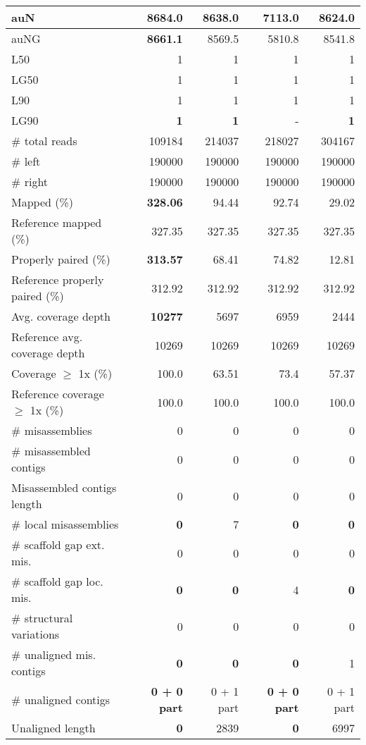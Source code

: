\documentclass[12pt,a4paper]{article}
\begin{document}
\begin{table}[ht]
\begin{center}
\begin{tabular}{|l*{4}{|r}|}
auN & {\bf 8684.0} & 8638.0 & 7113.0 & 8624.0 \\ \hline
auNG & {\bf 8661.1} & 8569.5 & 5810.8 & 8541.8 \\ \hline
L50 & 1 & 1 & 1 & 1 \\ \hline
LG50 & 1 & 1 & 1 & 1 \\ \hline
L90 & 1 & 1 & 1 & 1 \\ \hline
LG90 & {\bf 1} & {\bf 1} & - & {\bf 1} \\ \hline
\# total reads & 109184 & 214037 & 218027 & 304167 \\ \hline
\# left & 190000 & 190000 & 190000 & 190000 \\ \hline
\# right & 190000 & 190000 & 190000 & 190000 \\ \hline
Mapped (\%) & {\bf 328.06} & 94.44 & 92.74 & 29.02 \\ \hline
Reference mapped (\%) & 327.35 & 327.35 & 327.35 & 327.35 \\ \hline
Properly paired (\%) & {\bf 313.57} & 68.41 & 74.82 & 12.81 \\ \hline
Reference properly paired (\%) & 312.92 & 312.92 & 312.92 & 312.92 \\ \hline
Avg. coverage depth & {\bf 10277} & 5697 & 6959 & 2444 \\ \hline
Reference avg. coverage depth & 10269 & 10269 & 10269 & 10269 \\ \hline
Coverage $\geq$ 1x (\%) & 100.0 & 63.51 & 73.4 & 57.37 \\ \hline
Reference coverage $\geq$ 1x (\%) & 100.0 & 100.0 & 100.0 & 100.0 \\ \hline
\# misassemblies & 0 & 0 & 0 & 0 \\ \hline
\# misassembled contigs & 0 & 0 & 0 & 0 \\ \hline
Misassembled contigs length & 0 & 0 & 0 & 0 \\ \hline
\# local misassemblies & {\bf 0} & 7 & {\bf 0} & {\bf 0} \\ \hline
\# scaffold gap ext. mis. & 0 & 0 & 0 & 0 \\ \hline
\# scaffold gap loc. mis. & {\bf 0} & {\bf 0} & 4 & {\bf 0} \\ \hline
\# structural variations & 0 & 0 & 0 & 0 \\ \hline
\# unaligned mis. contigs & {\bf 0} & {\bf 0} & {\bf 0} & 1 \\ \hline
\# unaligned contigs & {\bf 0 + 0 part} & 0 + 1 part & {\bf 0 + 0 part} & 0 + 1 part \\ \hline
Unaligned length & {\bf 0} & 2839 & {\bf 0} & 6997 \\ \hline

\end{tabular}
\end{center}
\end{table}
\end{document}
